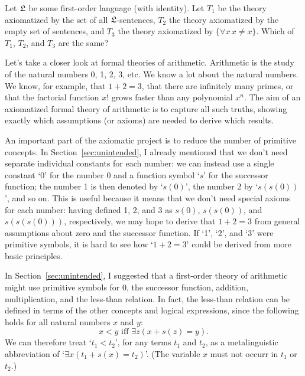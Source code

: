 
\begin{exercise}
  Let $\mathfrak{L}$ be some first-order language (with identity).
  Let $T_1$ be the theory axiomatized by the set of all $\mathfrak{L}$-sentences,
  $T_2$ the theory axiomatized by the empty set of sentences,
  and $T_3$ the theory axiomatized by $\{ \forall x \, x\ne x \}$.
  Which of $T_1$, $T_2$, and $T_3$ are the same?
\end{exercise}


Let's take a closer look at formal theories of arithmetic.
Arithmetic is the study of the natural numbers 0, 1, 2, 3, etc.
We know a lot about the natural numbers.
We know, for example,
that $1+2=3$,
that there are infinitely many primes,
or that the factorial function $x!$ grows faster than any polynomial $x^n$.
The aim of an axiomatized formal theory of arithmetic
is to capture all such truths,
showing exactly which assumptions (or axioms) are needed to derive which results.

An important part of the axiomatic project is to reduce the number of primitive concepts.
In Section~\ref{sec:unintended},
I already mentioned that
we don't need separate individual constants for each number:
we can instead use a single constant `0' for the number 0
and a function symbol `$s$' for the successor function;
the number 1 is then denoted by `$s(0)$',
the number 2 by `$s(s(0))$', and so on.
This is useful because it means that
we don't need special axioms for each number:
having defined 1, 2, and 3 as $s(0)$, $s(s(0))$, and $s(s(s(0)))$,
respectively,
we may hope to derive that $1 + 2 = 3$
from general assumptions about zero and the successor function.
If `1', `2', and `3' were primitive symbols,
it is hard to see how `$1 + 2 = 3$' could be derived
from more basic principles.

In Section~\ref{sec:unintended},
I suggested that a first-order theory of arithmetic
might use primitive symbols for 0,
the successor function,
addition,
multiplication,
and the less-than relation.
In fact,
the less-than relation can be defined in terms of the other concepts
and logical expressions,
since the following holds for all natural numbers $x$ and $y$:
\[
  x < y \text{ iff } \exists z (x + s(z) = y ).
\]
We can therefore treat `$t_1 < t_2$',
for any terms $t_1$ and $t_2$,
as a metalinguistic abbreviation of
`$\exists x ( t_1 + s(x) = t_2 )$'.
(The variable $x$ must not occurr in $t_1$ or $t_2$.)
%
%

